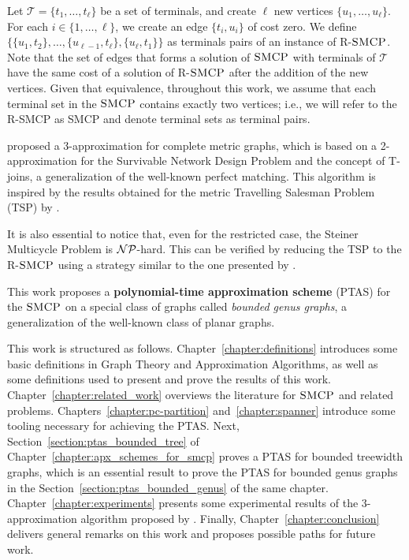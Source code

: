 Let \(\mathcal{T} = \{t_1, \dots, t_\ell\}\) be a set of terminals, and create \(\ell\) new vertices \(\{u_1, \dots, u_\ell\}\). For each \(i \in \{1, \ldots, \ell\}\), we create an edge \(\{t_i, u_i\}\) of cost zero. We define \(\{\{u_1, t_2\}, \dots, \{u_{\ell-1}, t_\ell\}, \{u_\ell, t_1\}\}\) as terminals pairs of an instance of R-\(\textsc{SMCP}\). Note that the set of edges that forms a solution of \(\textsc{SMCP}\) with terminals of \(\mathcal{T}\) have the same cost of a solution of R-\(\textsc{SMCP}\) after the addition of the new vertices. Given that equivalence, throughout this work, we assume that each terminal set in the \(\textsc{SMCP}\) contains exactly two vertices; i.e., we will refer to the R-SMCP as SMCP and denote terminal sets as terminal pairs.

\cite{smcp_3apx} proposed a 3-approximation for complete metric graphs, which is based on a 2-approximation for the Survivable Network Design Problem and the concept of T-joins, a generalization of the well-known perfect matching. This algorithm is inspired by the results obtained for the metric Travelling Salesman Problem (TSP) by \cite{Christofides2022WorstCaseAO}.

It is also essential to notice that, even for the restricted case, the Steiner Multicycle Problem is \(\mathcal{NP}\)-hard. This can be verified by reducing the TSP to the R-\(\textsc{SMCP}\) using a strategy similar to the one presented by \citeauthor{LINTZMAYER2020134}.

This work proposes a \textbf{polynomial-time approximation scheme} (PTAS) for the \(\textsc{SMCP}\) on a special class of graphs called \textit{bounded genus graphs}, a generalization of the well-known class of planar graphs.

This work is structured as follows. Chapter~\ref{chapter:definitions} introduces some basic definitions in Graph Theory and Approximation Algorithms, as well as some definitions used to present and prove the results of this work. Chapter~\ref{chapter:related_work} overviews the literature for \(\textsc{SMCP}\) and related problems. Chapters~\ref{chapter:pc-partition} and~\ref{chapter:spanner} introduce some tooling necessary for achieving the PTAS. Next, Section~\ref{section:ptas_bounded_tree} of Chapter~\ref{chapter:apx_schemes_for_smcp} proves a PTAS for bounded treewidth graphs, which is an essential result to prove the PTAS for bounded genus graphs in the Section~\ref{section:ptas_bounded_genus} of the same chapter. Chapter~\ref{chapter:experiments} presents some experimental results of the 3-approximation algorithm proposed by \cite{smcp_3apx}. Finally, Chapter~\ref{chapter:conclusion} delivers general remarks on this work and proposes possible paths for future work.

